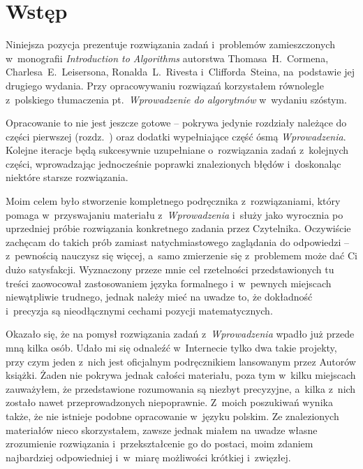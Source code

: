 \chapter{Wstęp}

Niniejsza pozycja prezentuje rozwiązania zadań i~problemów zamieszczonych w~monografii \textsl{Introduction to Algorithms} \cite{cormen} autorstwa Thomasa~H.~Cormena, Charlesa~E.~Leisersona, Ronalda~L.~Rivesta i~Clifforda~Steina, na~podstawie jej drugiego wydania. Przy opracowywaniu rozwiązań korzystałem równolegle z~polskiego tłumaczenia pt.~\textsl{Wprowadzenie do algorytmów} \cite{cormenpl} w~wydaniu szóstym.

Opracowanie to nie jest jeszcze gotowe -- pokrywa jedynie rozdziały należące do części pierwszej (rozdz.~)
oraz dodatki wypełniające część ósmą \textsl{Wprowadzenia}. Kolejne iteracje będą sukcesywnie uzupełniane o~rozwiązania zadań z~kolejnych części, wprowadzając jednocześnie poprawki znalezionych błędów i~doskonaląc niektóre starsze rozwiązania.

Moim celem było stworzenie kompletnego podręcznika z~rozwiązaniami, który pomaga w~przyswajaniu materiału z~\textsl{Wprowadzenia} i~służy jako wyrocznia po uprzedniej próbie rozwiązania konkretnego zadania przez Czytelnika. Oczywiście zachęcam do takich prób zamiast natychmiastowego zaglądania do odpowiedzi -- z~pewnością nauczysz się więcej, a~samo zmierzenie się z~problemem może dać Ci dużo satysfakcji. Wyznaczony przeze mnie cel rzetelności przedstawionych tu treści zaowocował zastosowaniem języka formalnego i~w~pewnych miejscach niewątpliwie trudnego, jednak należy mieć na uwadze to, że dokładność i~precyzja są nieodłącznymi cechami pozycji matematycznych.

Okazało się, że na pomysł rozwiązania zadań z~\textsl{Wprowadzenia} wpadło już przede mną kilka osób. Udało mi się odnaleźć w~Internecie tylko dwa takie projekty, przy czym jeden z~nich jest oficjalnym podręcznikiem lansowanym przez Autorów książki. Żaden nie pokrywa jednak całości materiału, poza tym w~kilku miejscach zauważyłem, że przedstawione rozumowania są niezbyt precyzyjne, a~kilka z~nich zostało nawet przeprowadzonych niepoprawnie. Z~moich poszukiwań wynika także, że nie istnieje podobne opracowanie w~języku polskim. Ze znalezionych materiałów nieco skorzystałem, zawsze jednak miałem na uwadze własne zrozumienie rozwiązania i~przekształcenie go do postaci, moim zdaniem najbardziej odpowiedniej i~w~miarę możliwości krótkiej i~zwięzłej.

